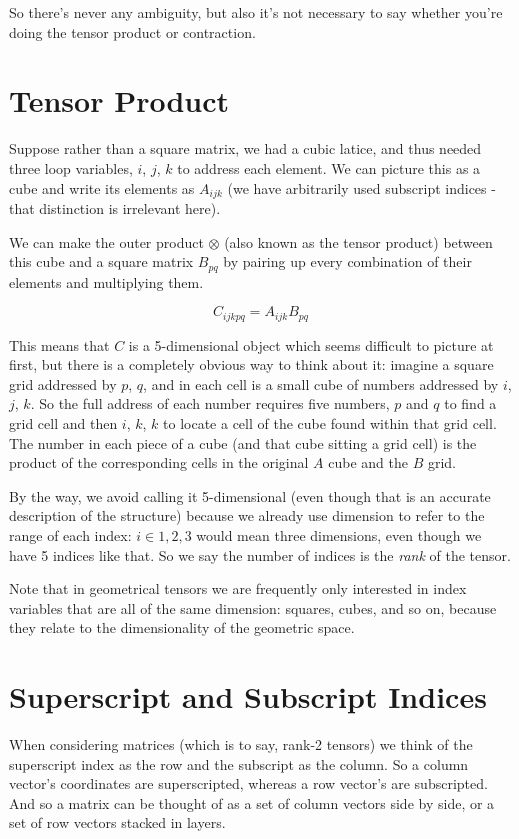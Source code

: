 So there's never any ambiguity, but also it's not necessary to say whether you're doing the tensor product or contraction.

\section{Tensor Product}

Suppose rather than a square matrix, we had a cubic latice, and thus needed three loop variables, $i$, $j$, $k$ to address each element. We can picture this as a cube and write its elements as $A_{ijk}$ (we have arbitrarily used subscript indices - that distinction is irrelevant here).

We can make the outer product $\otimes$ (also known as the tensor product) between this cube and a square matrix $B_{pq}$ by pairing up every combination of their elements and multiplying them.

$$C_{ijkpq} = A_{ijk}B_{pq}$$

This means that $C$ is a 5-dimensional object which seems difficult to picture at first, but there is a completely obvious way to think about it: imagine a square grid addressed by $p$, $q$, and in each cell is a small cube of numbers addressed by $i$, $j$, $k$. So the full address of each number requires five numbers, $p$ and $q$ to find a grid cell and then $i$, $k$, $k$ to locate a cell of the cube found within that grid cell. The number in each piece of a cube (and that cube sitting a grid cell) is the product of the corresponding cells in the original $A$ cube and the $B$ grid.

By the way, we avoid calling it 5-dimensional (even though that is an accurate description of the structure) because we already use dimension to refer to the range of each index: $i \in {1, 2, 3}$ would mean three dimensions, even though we have 5 indices like that. So we say the number of indices is the \textit{rank} of the tensor.

Note that in geometrical tensors we are frequently only interested in index variables that are all of the same dimension: squares, cubes, and so on, because they relate to the dimensionality of the geometric space.

\section{Superscript and Subscript Indices}

When considering matrices (which is to say, rank-2 tensors) we think of the superscript index as the row and the subscript as the column. So a column vector's coordinates are superscripted, whereas a row vector's are subscripted. And so a matrix can be thought of as a set of column vectors side by side, or a set of row vectors stacked in layers.

